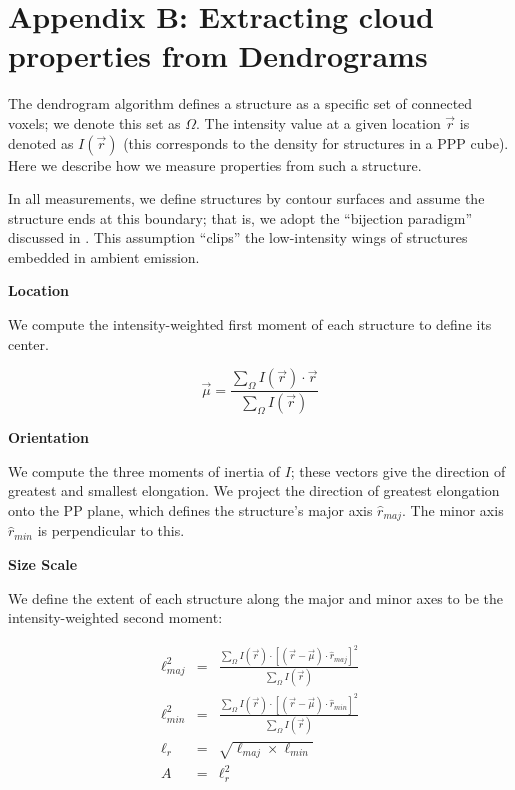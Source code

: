 \section{Appendix B: Extracting cloud properties from Dendrograms}

The dendrogram algorithm defines a structure as a specific set of
connected voxels; we denote this set as $\Omega$. The intensity value at a given location $\vec{r}$ is denoted as $I(\vec{r})$ (this corresponds to the density for structures in a PPP cube). Here we describe how we measure properties from such a structure.

In all measurements, we define structures by contour surfaces and assume the structure ends at this boundary; that is, we adopt the ``bijection paradigm'' discussed in \cite{http://adsabs.harvard.edu/abs/2008ApJ...679.1338R}. This
assumption ``clips'' the low-intensity wings of structures embedded in ambient emission.

\textbf{Location}

We compute the intensity-weighted first moment of each
structure to define its center.

\begin{equation}
\vec{\mu} = \frac{\sum_\Omega{I(\vec{r}) \cdot \vec{r}}}{\sum_\Omega{I(\vec{r})}}
\end{equation}

\textbf{Orientation}

We compute the three moments of inertia of $I$; these vectors give the direction of
greatest and smallest elongation. We project the direction of greatest
elongation onto the PP plane, which defines the structure's major
axis $\hat{r}_{maj}$. The minor axis $\hat{r}_{min}$ is perpendicular to this.

\textbf{Size Scale}

We define the extent of each structure along the major and
minor axes to be the intensity-weighted second moment:

\begin{eqnarray}
\ell_{maj}^2 &=& \frac{\sum_{\Omega}{I(\vec{r}) \cdot \left[(\vec{r} - \vec{\mu}) \cdot \hat{r}_{maj}\right]^2}}{ \sum_\Omega{I(\vec{r})}} \\
\ell_{min}^2 &=& \frac{\sum_{\Omega}{I (\vec{r}) \cdot \left[(\vec{r} - \vec{\mu}) \cdot \hat{r}_{min}\right]^2}}{ \sum_\Omega{I(\vec{r})}} \\
\ell_r &=& \sqrt{\ell_{maj} \times \ell_{min}} \\
A &=& \ell_r^2
\end{eqnarray}

